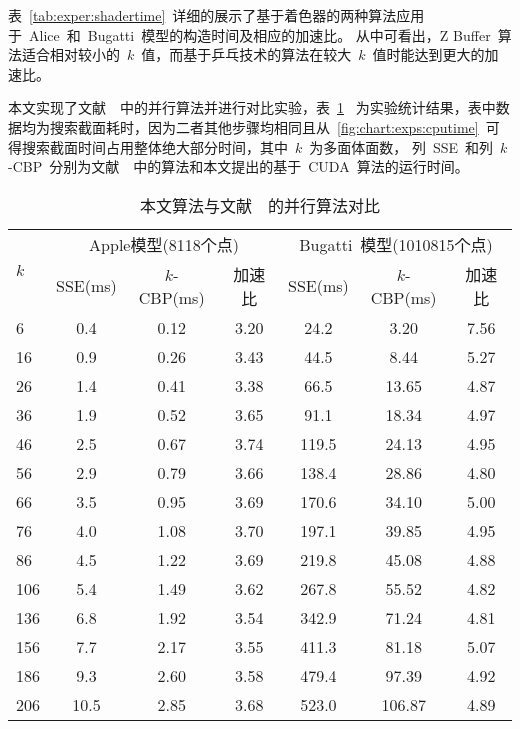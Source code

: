 表~\ref{tab:exper:shadertime}~详细的展示了基于着色器的两种算法应用于~Alice~和~Bugatti~模型的构造时间及相应的加速比。
从中可看出，Z Buffer~算法适合相对较小的~$k$~值，而基于乒乓技术的算法在较大~$k$~值时能达到更大的加速比。

本文实现了文献~~中的并行算法并进行对比实验，表~\ref{tab:exp:sse-time}
~为实验统计结果，表中数据均为搜索截面耗时，因为二者其他步骤均相同且从~\ref{fig:chart:exps:cputime}~可得搜索截面时间占用整体绝大部分时间，其中~$k$~为多面体面数，
列~SSE~和列~$k$-CBP~分别为文献~~中的算法和本文提出的基于~CUDA~算法的运行时间。

\begin{table}[htbp] 
\centering
\caption{本文算法与文献~~的并行算法对比}
\begin{tabular}{p{1.5cm}<{\centering}ccc ccc} %
\toprule[1.5pt]
\multirow{2}{*}{$k$} & \multicolumn{3}{c}{Apple模型(8118个点)} &
\multicolumn{3}{c}{Bugatti~模型(1010815个点)}\\
\cmidrule(lr){2-4}\cmidrule(lr){5-7}
~&SSE\cite{karlsson2010parallel}(ms) & $k$-CBP(ms) &  加速比 & SSE\cite{karlsson2010parallel}(ms) & $k$-CBP(ms) &  加速比\\
\midrule[1pt]
6 & 0.4 & 0.12  & 3.20     & 24.2 & 3.20  & 7.56 \\
16 & 0.9 & 0.26  & 3.43    & 44.5 & 8.44  & 5.27 \\
26 & 1.4 & 0.41  & 3.38    & 66.5 & 13.65  & 4.87 \\
36 & 1.9 & 0.52  & 3.65    & 91.1 & 18.34  & 4.97 \\
46 & 2.5 & 0.67  & 3.74    & 119.5 & 24.13  & 4.95 \\
56 & 2.9 & 0.79  & 3.66    & 138.4 & 28.86  & 4.80 \\
66 & 3.5 & 0.95  & 3.69    & 170.6 & 34.10  & 5.00 \\
76 & 4.0 & 1.08  & 3.70    & 197.1 & 39.85  & 4.95 \\
86 & 4.5 & 1.22  & 3.69    & 219.8 & 45.08  & 4.88 \\
106 & 5.4 & 1.49  & 3.62   & 267.8 & 55.52  & 4.82 \\
136 &  6.8 & 1.92  & 3.54  & 342.9 & 71.24  & 4.81 \\
156 &  7.7 & 2.17  & 3.55  & 411.3 & 81.18  & 5.07 \\
186 &  9.3 & 2.60  & 3.58  & 479.4 & 97.39  & 4.92 \\
206 &  10.5 & 2.85  & 3.68 & 523.0 & 106.87  & 4.89  \\  
\bottomrule[1.5pt]
\end{tabular}
\label{tab:exp:sse-time}
\end{table}


